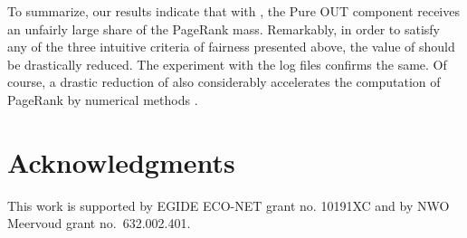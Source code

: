 \documentclass{article}
\begin{document}
To summarize, our results indicate that with , the Pure OUT
component receives an unfairly large share of the PageRank mass.
Remarkably, in order to satisfy any of the three intuitive criteria
of fairness presented above, the value of  should be drastically
reduced. The experiment with the log files confirms the same. Of
course, a drastic reduction of  also considerably accelerates the
computation of PageRank by numerical methods
\cite{Avrachenkov07SIAM,LangvilleMeyer,Berkhin05}.


\section*{Acknowledgments}

This work is supported by EGIDE ECO-NET grant no. 10191XC and by NWO Meervoud grant no.~632.002.401.
\end{document}
